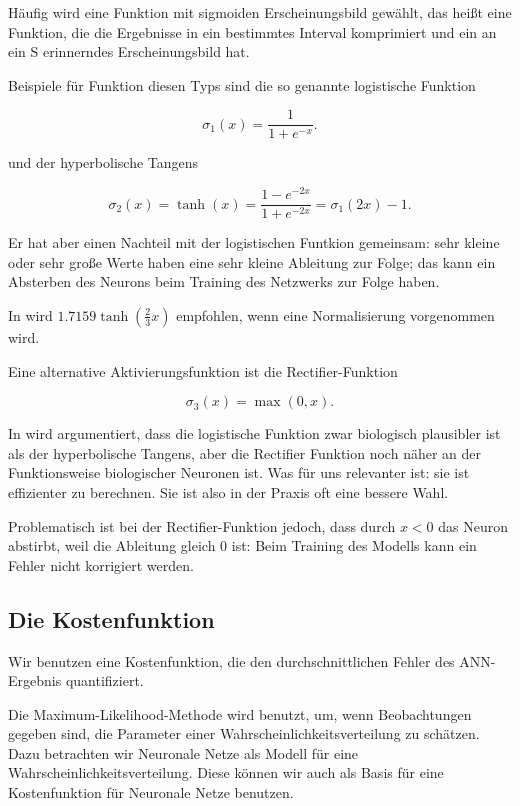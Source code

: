 Häufig wird eine Funktion mit sigmoiden Erscheinungsbild gewählt, das heißt eine Funktion, die die Ergebnisse in ein bestimmtes Interval komprimiert und ein an ein S erinnerndes Erscheinungsbild hat. 

Beispiele für Funktion diesen Typs sind die so genannte logistische Funktion

\begin{equation}
\sigma_1(x) = \frac{1}{1+e^{-x}}.
\end{equation}

und der hyperbolische Tangens

\begin{equation}
\sigma_2(x) = \tanh(x) = \frac{1-e^{-2x}}{1+e^{-2x}} = 
\sigma_1(2x) -1.
\end{equation}

Er hat aber einen Nachteil mit der logistischen Funtkion gemeinsam: sehr kleine oder sehr große Werte haben eine sehr kleine Ableitung zur Folge; das kann ein Absterben des Neurons beim Training des Netzwerks zur Folge haben. 

In \cite{lecunefficient} wird $1.7159 \tanh(\frac{2}{3} x)$ empfohlen, wenn eine Normalisierung vorgenommen wird. 

Eine alternative Aktivierungsfunktion ist die Rectifier-Funktion 

\begin{equation}
\sigma_3(x) = \max(0,x).
\end{equation} 

In \cite{glorot2011deep} wird argumentiert, dass die logistische Funktion zwar biologisch plausibler ist als der hyperbolische Tangens, aber die Rectifier Funktion noch näher an der Funktionsweise biologischer Neuronen ist. Was für uns relevanter ist: sie ist effizienter zu berechnen. Sie ist also in der Praxis oft eine bessere Wahl. 

Problematisch ist bei der Rectifier-Funktion jedoch, dass durch $x < 0$ das Neuron abstirbt, weil die Ableitung gleich 0 ist: Beim Training des Modells kann ein Fehler nicht korrigiert werden\cite{bengio2012practical}.

\subsection{Die Kostenfunktion}
Wir benutzen eine Kostenfunktion, die den durchschnittlichen Fehler des ANN-Ergebnis quantifiziert.

Die Maximum-Likelihood-Methode wird benutzt, um, wenn Beobachtungen gegeben sind, die Parameter einer Wahrscheinlichkeitsverteilung zu schätzen. Dazu betrachten wir Neuronale Netze als Modell für eine Wahrscheinlichkeitsverteilung. Diese können wir auch als Basis für eine Kostenfunktion für Neuronale Netze benutzen.

